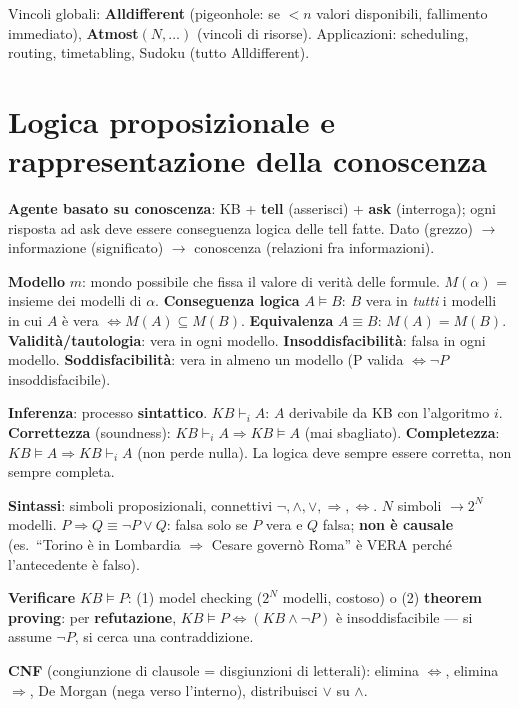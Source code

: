 \documentclass[10pt,a4paper]{article}
\begin{document}
Vincoli globali: \textbf{Alldifferent} (pigeonhole: se $<n$ valori disponibili, fallimento immediato), \textbf{Atmost}$(N,\dots)$ (vincoli di risorse). Applicazioni: scheduling, routing, timetabling, Sudoku (tutto Alldifferent).

\section{Logica proposizionale e rappresentazione della conoscenza}

\textbf{Agente basato su conoscenza}: KB + \textbf{tell} (asserisci) + \textbf{ask} (interroga); ogni risposta ad ask deve essere conseguenza logica delle tell fatte. Dato (grezzo) $\to$ informazione (significato) $\to$ conoscenza (relazioni fra informazioni).

\textbf{Modello} $m$: mondo possibile che fissa il valore di verità delle formule. $M(\alpha)$ = insieme dei modelli di $\alpha$.
\textbf{Conseguenza logica} $A \models B$: $B$ vera in \emph{tutti} i modelli in cui $A$ è vera $\iff M(A)\subseteq M(B)$. \textbf{Equivalenza} $A \equiv B$: $M(A)=M(B)$.
\textbf{Validità/tautologia}: vera in ogni modello. \textbf{Insoddisfacibilità}: falsa in ogni modello. \textbf{Soddisfacibilità}: vera in almeno un modello (P valida $\iff \neg P$ insoddisfacibile).

\textbf{Inferenza}: processo \textbf{sintattico}. $KB \vdash_i A$: $A$ derivabile da KB con l'algoritmo $i$. \textbf{Correttezza} (soundness): $KB \vdash_i A \Rightarrow KB \models A$ (mai sbagliato). \textbf{Completezza}: $KB \models A \Rightarrow KB \vdash_i A$ (non perde nulla). La logica deve sempre essere corretta, non sempre completa.

\textbf{Sintassi}: simboli proposizionali, connettivi $\neg,\wedge,\vee,\Rightarrow,\Leftrightarrow$. $N$ simboli $\to 2^N$ modelli. $P\Rightarrow Q \equiv \neg P \vee Q$: falsa solo se $P$ vera e $Q$ falsa; \textbf{non è causale} (es.\ ``Torino è in Lombardia $\Rightarrow$ Cesare governò Roma'' è VERA perché l'antecedente è falso).

\textbf{Verificare} $KB \models P$: (1) model checking ($2^N$ modelli, costoso) o (2) \textbf{theorem proving}: per \textbf{refutazione}, $KB \models P \iff (KB \wedge \neg P)$ è insoddisfacibile --- si assume $\neg P$, si cerca una contraddizione.

\textbf{CNF} (congiunzione di clausole = disgiunzioni di letterali): elimina $\Leftrightarrow$, elimina $\Rightarrow$, De Morgan (nega verso l'interno), distribuisci $\vee$ su $\wedge$.
\end{document}
